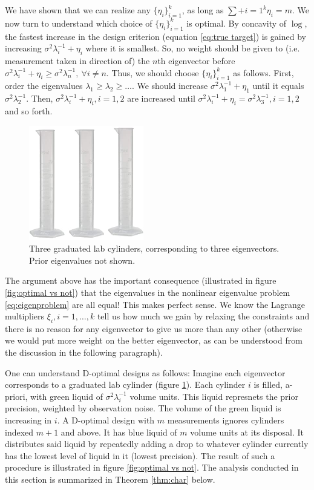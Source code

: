 \documentclass{amsart}
\numberwithin{equation}{section}
\begin{document}
We have shown that we can realize any $\{\eta_i\}_{i=1}^k$, as long as
$\sum+{i=1}^k \eta_i = m$. We now turn to understand which choice of
$\{\eta_i\}_{i=1}^k$ is optimal. By concavity of $\log$, the fastest
increase in the design criterion (equation \eqref{eq:true target}) is
gained by increasing $\sigma^2\lambda_i^{-1} + \eta_i$ where it is
smallest. So, no weight should be given to (i.e. measurement taken in
direction of) the $n$th eigenvector before $\sigma^2\lambda_i^{-1} +
\eta_i \geq \sigma^2\lambda_n^{-1},\ \forall i \neq n$. Thus, we
should choose $\{\eta_i\}_{i=1}^k$ as follows. First, order the
eigenvalues $\lambda_1 \geq \lambda_2 \geq \dots$. We should increase
$\sigma^2 \lambda_1^{-1} + \eta_1$ until it equals
$\sigma^2\lambda_2^{-1}$. Then, $\sigma^2 \lambda_i^{-1} +
\eta_i,i=1,2$ are increased until $\sigma^2 \lambda_i^{-1} + \eta_i =
\sigma^2\lambda_3^{-1},i=1,2$ and so forth.

\begin{figure}%
    \includegraphics[width=5cm, height=5cm]{cylinders.jpg}
    \caption{Three graduated lab cylinders, corresponding to three
      eigenvectors. Prior eigenvalues not shown.}
    \label{fig:cylinder}
\end{figure}

The argument above has the important consequence (illustrated in
figure \ref{fig:optimal vs not}) that the eigenvalues in the nonlinear
eigenvalue problem \eqref{eq:eigenproblem} are all equal! This makes
perfect sense. We know the Lagrange multipliers $\xi_i,i=1,\dots,k$
tell us how much we gain by relaxing the constraints and there is no
reason for any eigenvector to give us more than any other (otherwise
we would put more weight on the better eigenvector, as can be
understood from the discussion in the following paragraph).


One can understand D-optimal designs as follows: Imagine each
eigenvector corresponds to a graduated lab cylinder (figure
\ref{fig:cylinder}). Each cylinder $i$ is filled, a-priori, with green
liquid of $\sigma^2\lambda_i^{-1}$ volume units. This liquid
represnets the prior precision, weighted by observation noise. The
volume of the green liquid is increasing in $i$. A D-optimal design
with $m$ measurements ignores cylinders indexed $m+1$ and above. It
has blue liquid of $m$ volume units at its disposal. It distributes
said liquid by repeatedly adding a drop to whatever cylinder currently
has the lowest level of liquid in it (lowest precision). The result of
such a procedure is illustrated in figure \ref{fig:optimal vs
  not}. The analysis conducted in this section is summarized in
Theorem \ref{thm:char} below.
\end{document}
